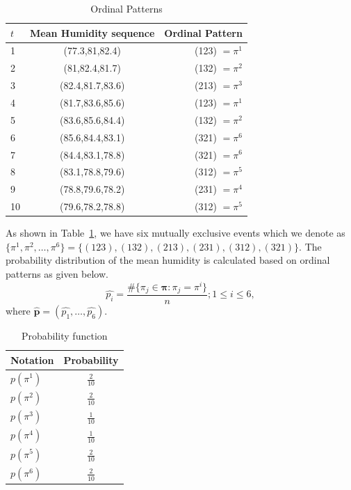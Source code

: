 \begin{table}[H]
	\centering
	\begin{tabular}{lcr}
		\toprule
		 $t$ & Mean Humidity sequence & Ordinal Pattern \\
		\midrule
	1 & (77.3,81,82.4) & (123) $=\pi^1$\\ 
	2 & (81,82.4,81.7) & (132) $=\pi^2$\\
	3 & (82.4,81.7,83.6) & (213) $=\pi^3$\\
	4 & (81.7,83.6,85.6) & (123) $=\pi^1$ \\
	5 & (83.6,85.6,84.4) & (132) $=\pi^2$\\ 
	6 & (85.6,84.4,83.1) & (321) $=\pi^6$\\
	7 & (84.4,83.1,78.8) & (321) $=\pi^6$\\
	8 & (83.1,78.8,79.6) & (312) $=\pi^5$\\ 
	9 & (78.8,79.6,78.2) & (231) $=\pi^4$\\
	10 & (79.6,78.2,78.8) & (312) $=\pi^5$\\
		\bottomrule
	\end{tabular}
	\caption{Ordinal Patterns}
	\label{tab:op}
\end{table}

As shown in Table~\ref{tab:op}, we have six mutually exclusive events which we denote as   
$\{{\pi}^1, {\pi}^2,\dots, {\pi}^{6}\}= \{(123),(132),(213),(231),(312),(321)\}$. 
The probability distribution of the mean humidity is calculated based on ordinal patterns as given below.
\begin{equation}
	\hat{p_i}=\frac{\#\{\pi_j \in \bm{\pi}: \pi_j=\pi^{i}\}}{n}; 1\le i \le 6,
\end{equation}
where $\hat{\bm{p}}=(\hat{p_1}, \dots ,\hat{p_6})$.

\begin{table}[hbt]
	\centering
	\begin{tabular}{lc}
		\toprule
		Notation & Probability \\ 
		\midrule
		$p(\pi^1)$ & $\frac{2}{10}$ \\ 
		$p(\pi^2)$ & $\frac{2}{10}$ \\
		$p(\pi^3)$ & $\frac{1}{10}$ \\
		$p(\pi^4)$ & $\frac{1}{10}$ \\
		$p(\pi^5)$ & $\frac{2}{10}$ \\ 
		$p(\pi^6)$ & $\frac{2}{10}$ \\
		\bottomrule
	\end{tabular}
	\caption{Probability function}
	\label{tab:probability_function}
\end{table}

